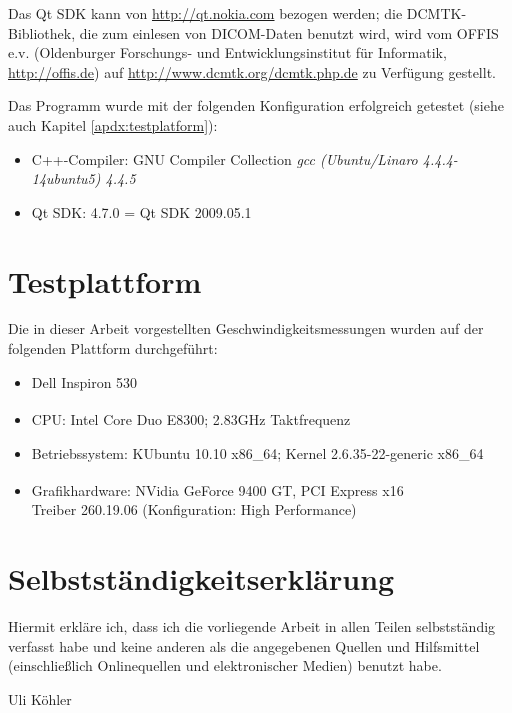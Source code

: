 \documentclass[a4paper,titlepage,12pt]{scrartcl}
\newtheorem[L]{boxedDefinition}{Definition}
\begin{document}
Das Qt SDK kann von \url{http://qt.nokia.com} bezogen werden; die DCMTK-Bibliothek, die zum einlesen von DICOM-Daten benutzt wird, wird vom OFFIS e.v. (Oldenburger Forschungs- und Entwicklungsinstitut für Informatik, \url{http://offis.de}) auf \url{http://www.dcmtk.org/dcmtk.php.de} zu Verfügung gestellt.

Das Programm wurde mit der folgenden Konfiguration erfolgreich getestet (siehe auch Kapitel \vref{apdx:testplatform}):
\begin{itemize}
 \item C++-Compiler: GNU Compiler Collection \textit{gcc (Ubuntu/Linaro 4.4.4-14ubuntu5) 4.4.5}
 \item Qt SDK: 4.7.0 = Qt SDK 2009.05.1
\end{itemize}

\section{Testplattform}\label{apdx:testplatform}
Die in dieser Arbeit vorgestellten Geschwindigkeitsmessungen wurden auf der folgenden Plattform durchgeführt:
\begin{itemize}
  \item Dell Inspiron 530
  \item CPU: Intel\textsuperscript{\textregistered} Core Duo E8300; 2.83GHz Taktfrequenz
  \item Betriebssystem: KUbuntu 10.10 x86\_64; Kernel 2.6.35-22-generic x86\_64
  \item Grafikhardware: NVidia\textsuperscript{\textregistered} GeForce 9400 GT, PCI Express x16\\
	Treiber 260.19.06 (Konfiguration: High Performance)
\end{itemize}
\newpage
\renewcommand\refname{Literatur- und Quellenverzeichnis}


\clearpage
\section{Selbstständigkeitserklärung}
Hiermit erkläre ich, dass ich die vorliegende Arbeit in allen Teilen selbstständig verfasst habe und keine anderen als die angegebenen Quellen und Hilfsmittel (einschließlich Onlinequellen und elektronischer Medien) benutzt habe.
\vfill
\begin{center}
\underline{\hspace{10cm}}\vspace{1cm}
\end{center}
\begin{center}
Uli Köhler
\end{center}
\vfill
\end{document}
